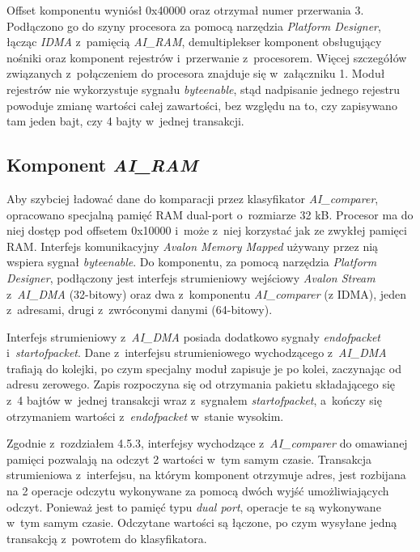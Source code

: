 Offset komponentu wyniósł 0x40000 oraz otrzymał numer przerwania 3. Podłączono go do szyny procesora za pomocą narzędzia \textit{Platform Designer}, łącząc \textit{IDMA} z~pamięcią \textit{AI\_RAM}, demultiplekser komponent obsługujący nośniki oraz komponent rejestrów i~przerwanie z~procesorem. Więcej szczegółów związanych z~połączeniem do procesora znajduje się w~załączniku 1. Moduł rejestrów nie wykorzystuje sygnału \textit{byteenable}, stąd nadpisanie jednego rejestru powoduje zmianę wartości całej zawartości, bez względu na to, czy zapisywano tam jeden bajt, czy 4 bajty w~jednej transakcji.

\subsection{Komponent \textit{AI\_RAM}}

Aby szybciej ładować dane do komparacji przez klasyfikator \textit{AI\_comparer}, opracowano specjalną pamięć RAM dual-port o~rozmiarze 32 kB. Procesor ma do niej dostęp pod offsetem 0x10000 i~może z~niej korzystać jak ze zwykłej pamięci RAM. Interfejs komunikacyjny \textit{Avalon Memory Mapped} używany przez nią wspiera sygnał \textit{byteenable}. Do komponentu, za pomocą narzędzia \textit{Platform Designer}, podłączony jest interfejs strumieniowy wejściowy \textit{Avalon Stream} z~\textit{AI\_DMA} (32-bitowy) oraz dwa z~komponentu \textit{AI\_comparer} (z IDMA), jeden z~adresami, drugi z~zwróconymi danymi (64-bitowy).

Interfejs strumieniowy z~\textit{AI\_DMA} posiada dodatkowo sygnały \textit{endofpacket} i~\textit{startofpacket}. Dane z~interfejsu strumieniowego wychodzącego z~\textit{AI\_DMA} trafiają do kolejki, po czym specjalny moduł zapisuje je po kolei, zaczynając od adresu zerowego. Zapis rozpoczyna się od otrzymania pakietu składającego się z~4 bajtów w~jednej transakcji wraz z~sygnałem \textit{startofpacket}, a~kończy się otrzymaniem wartości z~\textit{endofpacket} w~stanie wysokim.

Zgodnie z~rozdziałem 4.5.3, interfejsy wychodzące z~\textit{AI\_comparer} do omawianej pamięci pozwalają na odczyt 2 wartości w~tym samym czasie. Transakcja strumieniowa z~interfejsu, na którym komponent otrzymuje adres, jest rozbijana na 2 operacje odczytu wykonywane za pomocą dwóch wyjść umożliwiających odczyt. Ponieważ jest to pamięć typu \textit{dual port}, operacje te są wykonywane w~tym samym czasie. Odczytane wartości są łączone, po czym wysyłane jedną transakcją z~powrotem do klasyfikatora.

